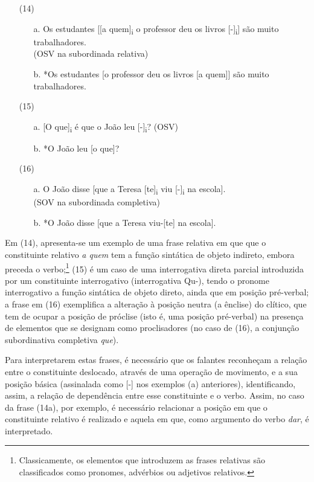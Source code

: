 \documentclass[output=paper,colorlinks,citecolor=brown,booklanguage=portuguese]{langscibook}
\begin{document}
\begin{enumerate}[align=left]
    \item [(14)]
    \begin{enumerate}
        \item [a.] Os estudantes [[a quem]\textsubscript{i} o professor deu os livros [-]\textsubscript{i}] são muito traba\-lhadores. \\
     		(OSV na subordinada relativa)
	\item[b.] *Os estudantes [o professor deu os livros [a quem]] são muito traba\-lhadores.
    \end{enumerate}
    \item[(15)]
    \begin{enumerate}
        \item [a.] [O que]\textsubscript{i} é que o João leu [-]\textsubscript{i}? (OSV)
	\item[b.] *O João leu [o que]?
    \end{enumerate}
    \item[(16)]
    \begin{enumerate}
        \item [a.] O João disse [que a Teresa [te]\textsubscript{i} viu [-]\textsubscript{i} na escola].\\ 
		(SOV na subordinada completiva)
	\item[b.] *O João disse [que a Teresa viu-[te] na escola].
    \end{enumerate}
\end{enumerate}

Em (14), apresenta-se um exemplo de uma frase relativa em que que o constituinte relativo \emph{a quem} tem a função sintática de objeto indireto, embora preceda o verbo;\footnote{Classicamente, os elementos que introduzem as frases relativas são classificados como pronomes, advérbios ou adjetivos relativos.} (15) é um caso de uma interrogativa direta parcial introduzida por um constituinte interrogativo (interrogativa Qu-), tendo o pronome interrogativo a função sintática de objeto direto, ainda que em posição pré-verbal; a frase em (16) exemplifica a alteração à posição neutra (a ênclise) do clítico, que tem de ocupar a posição de próclise (isto é, uma posição pré-verbal) na presença de elementos que se designam como proclisadores (no caso de (16), a conjunção subordinativa completiva \emph{que}).

Para interpretarem estas frases, é necessário que os falantes reconheçam a relação entre o constituinte deslocado, através de uma operação de movimento, e a sua posição básica (assinalada como [-] nos exemplos (a) anteriores), identificando, assim, a relação de dependência entre esse constituinte e o verbo. Assim, no caso da frase (14a), por exemplo, é necessário relacionar a posição em que o constituinte relativo é realizado e aquela em que, como argumento do verbo \emph{dar}, é interpretado. 
\end{document}
